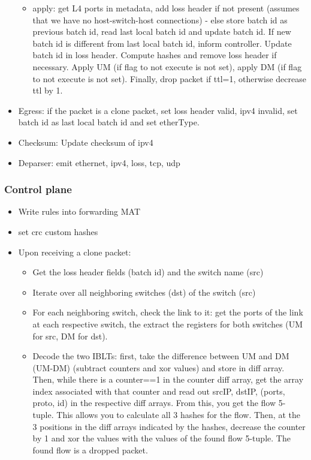 \documentclass[11pt,oneside,a4paper]{article}
\begin{document}
\begin{itemize}
\begin{itemize}
		\newpage
		\item apply: get L4 ports in metadata, add loss header if not present (assumes that we have no host-switch-host connections) - else store batch id as previous batch id, read last local batch id and update batch id. If new batch id is different from last local batch id, inform controller. Update batch id in loss header. Compute hashes and remove loss header if necessary. Apply UM (if flag to not execute is not set), apply DM (if flag to not execute is not set). Finally, drop packet if ttl=1, otherwise decrease ttl by 1.
	\end{itemize}
	\item Egress: if the packet is a clone packet, set loss header valid, ipv4 invalid, set batch id as last local batch id and set etherType.
	\item Checksum: Update checksum of ipv4
	\item Deparser: emit ethernet, ipv4, loss, tcp, udp
\end{itemize}
\vspace{-\topsep}

\subsubsection{Control plane}

\vspace{-\topsep}
\begin{itemize}
	\setlength{\itemsep}{0pt}
	\setlength{\parskip}{0pt}
	\item Write rules into forwarding MAT
	\item set crc custom hashes
	\item Upon receiving a clone packet:
	\begin{itemize}
		\item Get the loss header fields (batch id) and the switch name (src)
		\item Iterate over all neighboring switches (dst) of the switch (src)
		\item For each neighboring switch, check the link to it: get the ports of the link at each respective switch, the extract the registers for both switches (UM for src, DM for dst).
		\item Decode the two IBLTs: first, take the difference between UM and DM (UM-DM) (subtract counters and xor values) and store in diff array. Then, while there is a counter==1 in the counter diff array, get the array index associated with that counter and read out srcIP, dstIP, (ports, proto, id) in the respective diff arrays. From this, you get the flow 5-tuple. This allows you to calculate all 3 hashes for the flow. Then, at the 3 positions in the diff arrays indicated by the hashes, decrease the counter by 1 and xor the values with the values of the found flow 5-tuple. The found flow is a dropped packet.
	\end{itemize}
\end{itemize}
\vspace{-\topsep}
\end{document}
